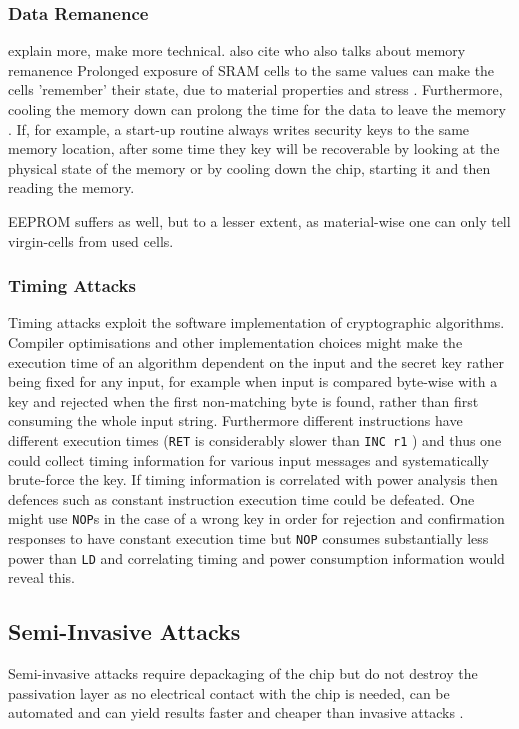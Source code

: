 	\subsubsection{Data Remanence}
	{\color{red} explain more, make more technical. also cite \citep{website:ibm_secure} who also talks about memory remanence}
	Prolonged exposure of SRAM cells to the same values can make the cells 'remember' their state, due to material properties and stress \citep{gutman:memory_remanence}. Furthermore, cooling the memory down can prolong the time for the data to leave the memory \citep{gutman:memory_remanence} \citep{sergei:RAM} \citep{sergei:thesis}. If, for example, a start-up routine always writes security keys to the same memory location, after some time they key will be recoverable by looking at the physical state of the memory or by cooling down the chip, starting it and then reading the memory.
	
	EEPROM suffers as well, but to a lesser extent, as material-wise one can only tell virgin-cells from used cells\citep{sergei:thesis}. 
	
	\subsubsection{Timing Attacks}
	Timing attacks exploit the software implementation of cryptographic algorithms. Compiler optimisations and other implementation choices might make the execution time of an algorithm dependent on the input and the secret key rather being fixed for any input, for example when input is compared byte-wise with a key and rejected when the first non-matching byte is found, rather than first consuming the whole input string. Furthermore different instructions have different execution times (\texttt{RET} is considerably slower than \texttt{INC r1} \citep{atmega_manual}) and thus one could collect timing information for various input messages and systematically brute-force the key. If timing information is correlated with power analysis then defences such as constant instruction execution time could be defeated. One might use \texttt{NOP}s in the case of a wrong key in order for rejection and confirmation responses to have constant execution time but \texttt{NOP} consumes substantially less power than \texttt{LD} \citep{glitches_paper} and correlating timing and power consumption information would reveal this.

	\subsection{Semi-Invasive Attacks}
	Semi-invasive attacks require depackaging of the chip but do not destroy the passivation layer as no electrical contact with the chip is needed, can be automated and can yield results faster and cheaper than invasive attacks \citep{sergei:thesis}.
	
